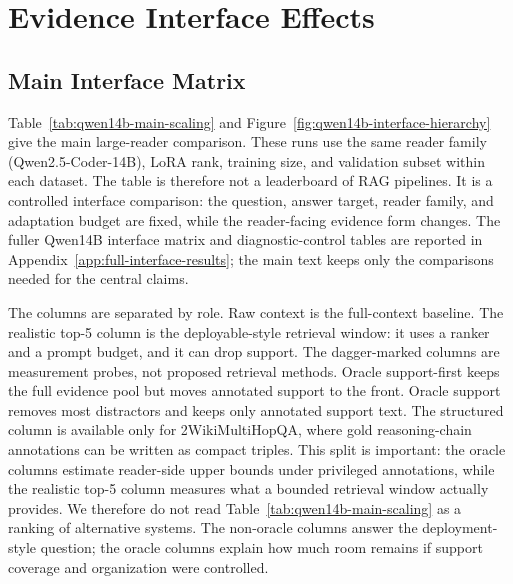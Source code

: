 \documentclass[a4paper,fleqn]{cas-sc}
\begin{document}
\section{Evidence Interface Effects}

\subsection{Main Interface Matrix}

Table~\ref{tab:qwen14b-main-scaling} and
Figure~\ref{fig:qwen14b-interface-hierarchy} give the main large-reader
comparison. These runs use the same reader family (Qwen2.5-Coder-14B), LoRA
rank, training size, and validation subset within each dataset. The table is
therefore not a leaderboard of RAG pipelines. It is a controlled interface
comparison: the question, answer target, reader family, and adaptation budget
are fixed, while the reader-facing evidence form changes.
The fuller Qwen14B interface matrix and diagnostic-control tables are reported
in Appendix~\ref{app:full-interface-results}; the main text keeps only the
comparisons needed for the central claims.

The columns are separated by role. Raw context is the full-context baseline.
The realistic top-5 column is the deployable-style retrieval window: it uses a
ranker and a prompt budget, and it can drop support. The dagger-marked columns
are measurement probes, not proposed retrieval methods. Oracle support-first
keeps the full evidence pool but moves annotated support to the front.
Oracle support removes most distractors and keeps only annotated support text.
The structured column is available only for 2WikiMultiHopQA, where gold
reasoning-chain annotations can be written as compact triples. This split is
important: the oracle columns estimate reader-side upper bounds under
privileged annotations, while the realistic top-5 column measures what a
bounded retrieval window actually provides. We therefore do not read
Table~\ref{tab:qwen14b-main-scaling} as a ranking of alternative systems. The
non-oracle columns answer the deployment-style question; the oracle columns
explain how much room remains if support coverage and organization were
controlled.
\end{document}
